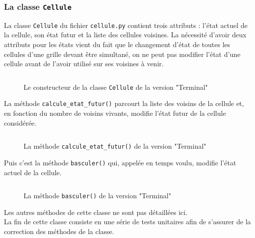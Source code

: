 \documentclass[11pt]{article}
\begin{document}
\subsubsection{La classe \texttt{Cellule}}

La classe \texttt{Cellule} du fichier \texttt{cellule.py} contient trois attributs : l'état actuel de la cellule, son état futur et la liste des cellules voisines. La nécessité d'avoir deux attributs pour les états vient du fait que le changement d'état de toutes les cellules d'une grille devant être simultané, on ne peut pas modifier l'état d'une cellule avant de l'avoir utilisé sur ses voisines à venir. 

\begin{figure}[h]
\inputminted[numbersep=2pt,linenos=true,frame=single,bgcolor=black!5,firstline=13,lastline=17]{python}{../code/cellule.py} \vspace*{-0.5cm}
\caption{\label{fig:classeCellule}Le constructeur de la classe \texttt{Cellule} de la version "Terminal"}
\end{figure}

La méthode \texttt{calcule_etat_futur()} parcourt la liste des voisins de la cellule et, en fonction du nombre de voisins vivants, modifie l'état futur de la cellule considérée. 

\begin{figure}[h]
\inputminted[numbersep=2pt,linenos=true,frame=single,bgcolor=black!5,firstline=51,lastline=65]{python}{../code/cellule.py} \vspace*{-0.5cm}
\caption{La méthode \texttt{calcule_etat_futur()} de la version "Terminal"}
\end{figure}

\newpage

Puis c'est la méthode \texttt{basculer()} qui, appelée en temps voulu, modifie l'état actuel de la cellule.
\begin{figure}[!h]
\inputminted[numbersep=2pt,linenos=true,frame=single,bgcolor=black!5,firstline=39,lastline=41]{python}{../code/cellule.py} \vspace*{-0.5cm}
\caption{La méthode \texttt{basculer()} de la version "Terminal"}
\end{figure}

\noindent Les autres méthodes de cette classe ne sont pas détaillées ici.\\
La fin de cette classe consiste en une série de tests unitaires afin de s'assurer de la correction des méthodes de la classe.
\end{document}
